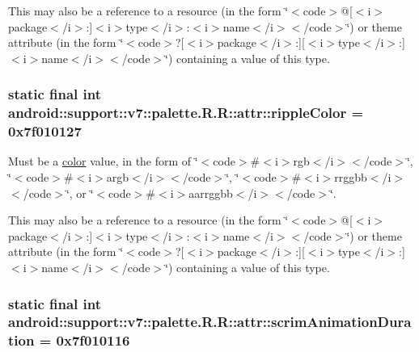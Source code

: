 This may also be a reference to a resource (in the form \char`\"{}$<$code$>$@\mbox{[}$<$i$>$package$<$/i$>$:\mbox{]}$<$i$>$type$<$/i$>$:$<$i$>$name$<$/i$>$$<$/code$>$\char`\"{}) or theme attribute (in the form \char`\"{}$<$code$>$?\mbox{[}$<$i$>$package$<$/i$>$:\mbox{]}\mbox{[}$<$i$>$type$<$/i$>$:\mbox{]}$<$i$>$name$<$/i$>$$<$/code$>$\char`\"{}) containing a value of this type. \hypertarget{classandroid_1_1support_1_1v7_1_1palette_1_1_r_1_1attr_f313eca59fde4934f2daf6b8c79227af}{
\subsubsection[{rippleColor}]{\setlength{\rightskip}{0pt plus 5cm}static final int android::support::v7::palette.R.R::attr::rippleColor = 0x7f010127}}
\label{classandroid_1_1support_1_1v7_1_1palette_1_1_r_1_1attr_f313eca59fde4934f2daf6b8c79227af}


Must be a \hyperlink{classandroid_1_1support_1_1v7_1_1palette_1_1_r_1_1color}{color} value, in the form of \char`\"{}$<$code$>$\#$<$i$>$rgb$<$/i$>$$<$/code$>$\char`\"{}, \char`\"{}$<$code$>$\#$<$i$>$argb$<$/i$>$$<$/code$>$\char`\"{}, \char`\"{}$<$code$>$\#$<$i$>$rrggbb$<$/i$>$$<$/code$>$\char`\"{}, or \char`\"{}$<$code$>$\#$<$i$>$aarrggbb$<$/i$>$$<$/code$>$\char`\"{}. 

This may also be a reference to a resource (in the form \char`\"{}$<$code$>$@\mbox{[}$<$i$>$package$<$/i$>$:\mbox{]}$<$i$>$type$<$/i$>$:$<$i$>$name$<$/i$>$$<$/code$>$\char`\"{}) or theme attribute (in the form \char`\"{}$<$code$>$?\mbox{[}$<$i$>$package$<$/i$>$:\mbox{]}\mbox{[}$<$i$>$type$<$/i$>$:\mbox{]}$<$i$>$name$<$/i$>$$<$/code$>$\char`\"{}) containing a value of this type. \hypertarget{classandroid_1_1support_1_1v7_1_1palette_1_1_r_1_1attr_3bf0c1f53e9712ff9c0448e1528b8496}{
\subsubsection[{scrimAnimationDuration}]{\setlength{\rightskip}{0pt plus 5cm}static final int android::support::v7::palette.R.R::attr::scrimAnimationDuration = 0x7f010116}}
\label{classandroid_1_1support_1_1v7_1_1palette_1_1_r_1_1attr_3bf0c1f53e9712ff9c0448e1528b8496}


